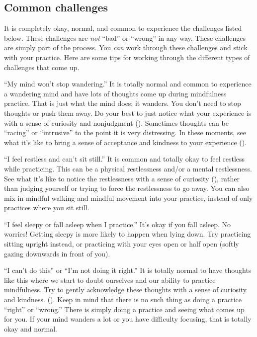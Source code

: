 \subsection{Common challenges}
\bgroup{}
	It is completely okay, normal, and common to experience the challenges listed below. These challenges are \emph{not} “bad” or “wrong” in any way. These challenges are simply part of the process. You \emph{can} work through these challenges and stick with your practice. Here are some tips for working through the different types of challenges that come up.
	\begin{description*}
		\item[“My mind won’t stop wandering.”] It is totally normal and common to experience a wandering mind and have lots of thoughts come up during mindfulness practice. That is just what the mind does; it wanders. You don’t need to stop thoughts or push them away. Do your best to just notice what your experience is with a sense of curiosity and nonjudgment (). Sometimes thoughts can be “racing” or “intrusive” to the point it is very distressing. In these moments, see what it’s like to bring a sense of acceptance and kindness to your experience ().
		\item[“I feel restless and can’t sit still.”] It is common and totally okay to feel restless while practicing. This can be a physical restlessness and/or a mental restlessness. See what it’s like to notice the restlessness with a sense of curiosity (), rather than judging yourself or trying to force the restlessness to go away. You can also mix in mindful walking and mindful movement into your practice, instead of only practices where you sit still.
		\item[“I feel sleepy or fall asleep when I practice.”] It’s okay if you fall asleep. No worries! Getting sleepy is more likely to happen when lying down. Try practicing sitting upright instead, or practicing with your eyes open or half open (softly gazing downwards in front of you).
		\item[“I can’t do this” or “I’m not doing it right.”] It is totally normal to have thoughts like this where we start to doubt ourselves and our ability to practice mindfulness. Try to gently acknowledge these thoughts with a sense of curiosity and kindness. (). Keep in mind that there is no such thing as doing a practice “right” or “wrong.” There is simply doing a practice and seeing what comes up for you. If your mind wanders a lot or you have difficulty focusing, that is totally okay and normal.

\end{description*}
